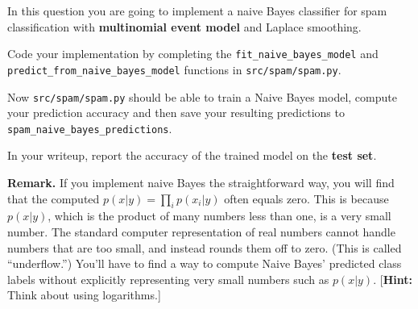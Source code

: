 \item {}
In this question you are going to implement a naive Bayes classifier for spam
classification with {\bf multinomial event model} and Laplace smoothing.

Code your implementation by completing the \texttt{fit\_naive\_bayes\_model}
and \\\texttt{predict\_from\_naive\_bayes\_model} functions in
\texttt{src/spam/spam.py}.

Now \texttt{src/spam/spam.py} should be able to train a Naive Bayes model,
compute your prediction accuracy and then save your resulting predictions
to \texttt{spam\_naive\_bayes\_predictions}.

In your writeup, report the accuracy of the trained model on the \textbf{test set}.

{\bf Remark.} If you implement naive Bayes the straightforward way, you will find
that the computed $p(x|y) = \prod_i p(x_i | y)$ often equals zero.  This is
because $p(x|y)$, which is the product of many numbers less than one, is a very
small  number. The standard computer representation of real numbers cannot
handle numbers that are too small, and instead rounds them off to zero.  (This
is called  ``underflow.'')  You'll have to find a way to compute Naive Bayes'
predicted  class labels without explicitly representing very small numbers such
as $p(x|y)$.
[\textbf{Hint:} Think about using logarithms.]\\[50pt]